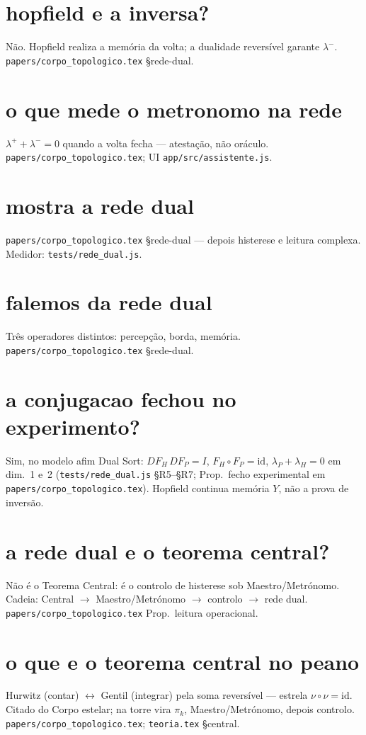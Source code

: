 \documentclass[11pt,a4paper]{article}
\newcommand{\code}[1]{\texttt{\small #1}}
\begin{document}
\section{hopfield e a inversa?}
Não. Hopfield realiza a memória da volta; a dualidade reversível garante $\lambda^{-}$.
\code{papers/corpo\_topologico.tex} \S rede-dual.

\section{o que mede o metronomo na rede}
$\lambda^{+}+\lambda^{-}=0$ quando a volta fecha --- atestação, não oráculo.
\code{papers/corpo\_topologico.tex}; UI \code{app/src/assistente.js}.

\section{mostra a rede dual}
\code{papers/corpo\_topologico.tex} \S rede-dual --- depois histerese e leitura complexa.
Medidor: \code{tests/rede\_dual.js}.

\section{falemos da rede dual}
Três operadores distintos: percepção, borda, memória.
\code{papers/corpo\_topologico.tex} \S rede-dual.

\section{a conjugacao fechou no experimento?}
Sim, no modelo afim Dual Sort: $DF_H\,DF_P=I$, $F_H\circ F_P=\mathrm{id}$,
$\lambda_P+\lambda_H=0$ em dim.~1 e~2 (\code{tests/rede\_dual.js} §R5--§R7;
Prop.\ fecho experimental em \code{papers/corpo\_topologico.tex}).
Hopfield continua memória $Y$, não a prova de inversão.

\section{a rede dual e o teorema central?}
Não é o Teorema Central: é o controlo de histerese sob Maestro/Metrónomo.
Cadeia: Central $\to$ Maestro/Metrónomo $\to$ controlo $\to$ rede dual.
\code{papers/corpo\_topologico.tex} Prop.\ leitura operacional.

\section{o que e o teorema central no peano}
Hurwitz (contar) $\leftrightarrow$ Gentil (integrar) pela soma reversível ---
estrela $\nu\circ\nu=\mathrm{id}$. Citado do Corpo estelar; na torre vira
$\pi_k$, Maestro/Metrónomo, depois controlo.
\code{papers/corpo\_topologico.tex}; \code{teoria.tex} \S central.
\end{document}
